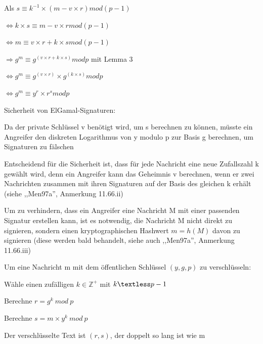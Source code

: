 \documentclass[a4paper]{article}
\begin{document}
\begin{multicols}{3}
\begin{itemize*}
\begin{itemize*}
                  \item Als $s\equiv k^{-1}\times(m-v\times r) mod (p-1)$
                  \begin{itemize*} \item $\Leftrightarrow k \times s\equiv m-v\times r mod (p-1)$ \item $\Leftrightarrow m \equiv v\times r+k\times s mod (p-1)$ \item $\Rightarrow g^m \equiv g^{(v\times r+ k\times s)} mod p$ mit Lemma 3 \item $\Leftrightarrow g^m \equiv g^{(v\times r)}\times g^{(k\times s)} mod p$ \item $\Leftrightarrow g^m \equiv y^r\times r^s mod p$ \end{itemize*}
            \end{itemize*}
            \item Sicherheit von ElGamal-Signaturen:
            \begin{itemize*}
                  \item Da der private Schlüssel v benötigt wird, um s berechnen zu können, müsste ein Angreifer den diskreten Logarithmus von y modulo p zur Basis g berechnen, um Signaturen zu fälschen
                  \item Entscheidend für die Sicherheit ist, dass für jede Nachricht eine neue Zufallszahl k gewählt wird, denn ein Angreifer kann das Geheimnis v berechnen, wenn er zwei Nachrichten zusammen mit ihren Signaturen auf der Basis des gleichen k erhält (siehe ,,Men97a'', Anmerkung 11.66.ii)
                  \item Um zu verhindern, dass ein Angreifer eine Nachricht M mit einer passenden Signatur erstellen kann, ist es notwendig, die Nachricht M nicht direkt zu signieren, sondern einen kryptographischen Hashwert $m=h(M)$ davon zu signieren (diese werden bald behandelt, siehe auch ,,Men97a'', Anmerkung 11.66.iii)
            \end{itemize*}
            \item Um eine Nachricht m mit dem öffentlichen Schlüssel $(y,g,p)$ zu
            verschlüsseln:
            \begin{itemize*}
                  \item Wähle einen zufälligen $k\in\mathbb{Z}^+$ mit $k\textless p-1$
                  \item Berechne $r=g^k\ mod\ p$
                  \item Berechne $s=m\times y^k\ mod\ p$
                  \item Der verschlüsselte Text ist $(r,s)$, der doppelt so lang ist wie m

\end{itemize*}
\end{itemize*}
\end{multicols}
\end{document}
